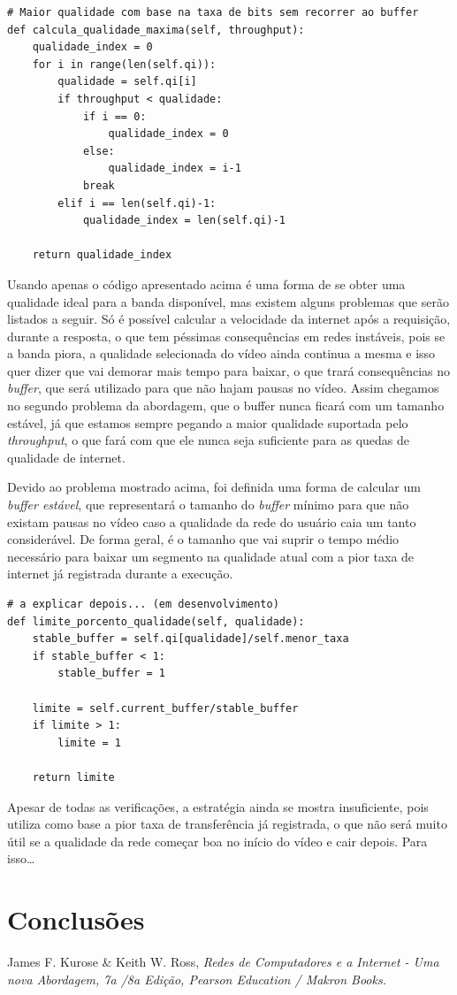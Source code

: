 \documentclass[12pt]{article}
\begin{document}
\begin{lstlisting}
# Maior qualidade com base na taxa de bits sem recorrer ao buffer
def calcula_qualidade_maxima(self, throughput):
    qualidade_index = 0
    for i in range(len(self.qi)):
        qualidade = self.qi[i]
        if throughput < qualidade:
            if i == 0:
                qualidade_index = 0
            else:
                qualidade_index = i-1
            break
        elif i == len(self.qi)-1:
            qualidade_index = len(self.qi)-1

    return qualidade_index
\end{lstlisting}

Usando apenas o código apresentado acima é uma forma de se obter uma qualidade ideal para a banda disponível, mas existem alguns problemas que serão listados a seguir. Só é possível calcular a velocidade da internet após a requisição, durante a resposta, o que tem péssimas consequências em redes instáveis, pois se a banda piora, a qualidade selecionada do vídeo ainda continua a mesma e isso quer dizer que vai demorar mais tempo para baixar, o que trará consequências no \textit{buffer}, que será utilizado para que não hajam pausas no vídeo. Assim chegamos no segundo problema da abordagem, que o buffer nunca ficará com um tamanho estável, já que estamos sempre pegando a maior qualidade suportada pelo \textit{throughput}, o que fará com que ele nunca seja suficiente para as quedas de qualidade de internet.

Devido ao problema mostrado acima, foi definida uma forma de calcular um \textit{buffer estável}, que representará o tamanho do \textit{buffer} mínimo para que não existam pausas no vídeo caso a qualidade da rede do usuário caia um tanto considerável. De forma geral, é o tamanho que vai suprir o tempo médio necessário para baixar um segmento na qualidade atual com a pior taxa de internet já registrada durante a execução.

\begin{lstlisting}
# a explicar depois... (em desenvolvimento)
def limite_porcento_qualidade(self, qualidade):
    stable_buffer = self.qi[qualidade]/self.menor_taxa
    if stable_buffer < 1:
        stable_buffer = 1

    limite = self.current_buffer/stable_buffer
    if limite > 1:
        limite = 1

    return limite
\end{lstlisting}

Apesar de todas as verificações, a estratégia ainda se mostra insuficiente, pois utiliza como base a pior taxa de transferência já registrada, o que não será muito útil se a qualidade da rede começar boa no início do vídeo e cair depois. Para isso\dots

\section{Conclusões}
\lipsum[3]

\begin{thebibliography}{9}

\noindent James F. Kurose \& Keith W. Ross, 
\textit{Redes de Computadores e a Internet - Uma nova Abordagem, 7a /8a Edição, Pearson Education / Makron Books.}

\end{thebibliography}
\end{document}
